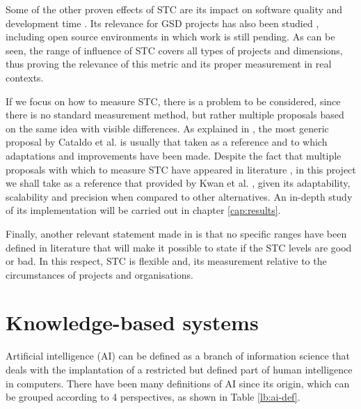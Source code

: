 Some of the other proven effects of STC are its impact on software quality \cite{cataldo_identification_2006, cataldo_socio-technical_2008, kwan_does_2011, cataldo_coordination_2013, smite_socio-technical_2012, ehrlich_analysis_2008, marczak_investigating_2009} and development time \cite{cataldo_identification_2006, cataldo_socio-technical_2008, kwan_does_2011}. Its relevance for GSD projects has also been studied \cite{cataldo_identification_2006, cataldo_socio-technical_2008, cataldo_coordination_2013, ehrlich_analysis_2008}, including open source environments \cite{wagstrom_communication_2010, syeed_socio-technical_2015, syeed_socio-technical_2014, syeed_socio-technical_2014-1, bolici_coordination_2009} in which work is still pending. As can be seen, the range of influence of STC covers all types of projects and dimensions, thus proving the relevance of this metric and its proper measurement in real contexts.

If we focus on how to measure STC, there is a problem to be considered, since there is no standard measurement method, but rather multiple proposals based on the same idea with visible differences. As explained in \cite{sierra_systematic_2018}, the most generic proposal by Cataldo et al. \cite{cataldo_identification_2006, cataldo_socio-technical_2008} is usually that taken as a reference and to which adaptations and improvements have been made. Despite the fact that multiple proposals with which to measure STC have appeared in literature \cite{cataldo_identification_2006, cataldo_socio-technical_2008, wagstrom_communication_2010, valetto_using_2007, portillo_2014, li_analysis_2012}, in this project we shall take as a reference that provided by Kwan et al. \cite{kwan_weighted_2009, kwan_does_2011}, given its adaptability, scalability and precision when compared to other alternatives. An in-depth study of its implementation will be carried out in chapter \ref{cap:results}.

Finally, another relevant statement made in \cite{sierra_systematic_2018} is that no specific ranges have been defined in literature that will make it possible to state if the STC levels are good or bad. In this respect, STC is flexible and, its measurement relative to the circumstances of projects and organisations.

\section{Knowledge-based systems}

Artificial intelligence (AI) can be defined as a branch of information science that deals with the implantation of a restricted but defined part of human intelligence \cite{popovic_methods_1994} in computers. There have been many definitions of AI since its origin, which can be grouped according to 4 perspectives, as shown in Table \ref{lb:ai-def}.

